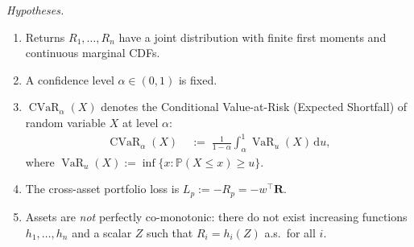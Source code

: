 \documentclass[12pt,openany]{book}
\newcommand{\Prob}{\mathbb{P}}
\newcommand{\bfw}{\mathbf{w}}
\DeclareMathOperator{\CVaR}{CVaR}
\DeclareMathOperator{\VaR}{VaR}
\numberwithin{equation}{chapter}
\theoremstyle{plain}
\theoremstyle{definition}
\theoremstyle{remark}
\def\bfw{w}%
\begin{document}
\begin{enumerate}[label=\textbf{C\arabic*.}, leftmargin=*, widest=C4,
                  itemsep=6pt, parsep=2pt]
        \emph{Hypotheses.}
        \begin{enumerate}[label=(\roman*), itemsep=2pt]
          \item Returns $R_1,\ldots,R_n$ have a joint distribution
                with finite first moments and continuous marginal
                CDFs.
          \item A confidence level $\alpha \in (0,1)$ is fixed.
          \item $\CVaR_\alpha(X)$ denotes the Conditional
                Value-at-Risk (Expected Shortfall) of random variable
                $X$ at level $\alpha$:
                \begin{align}
                  \CVaR_\alpha(X)
                    &\;:=\;
                      \frac{1}{1-\alpha}
                      \int_\alpha^1
                      \VaR_u(X)\,\mathrm{d}u,
                  \label{eq:sum-cvar-def}
                \end{align}
                where $\VaR_u(X) := \inf\{x : \Prob(X \leq x)
                \geq u\}$.
          \item The cross-asset portfolio loss is
                $L_p := -R_p = -\bfw^\top\mathbf{R}$.
          \item Assets are \emph{not} perfectly co-monotonic:
                there do not exist increasing functions
                $h_1,\ldots,h_n$ and a scalar $Z$ such that
                $R_i = h_i(Z)$ a.s.\ for all $i$.
        \end{enumerate}


\end{enumerate}
\end{document}
